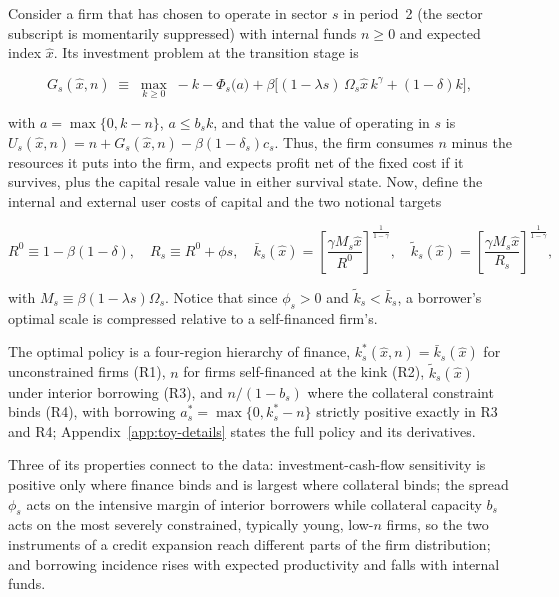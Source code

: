 \documentclass[12pt]{article}
\begin{document}
Consider a firm that has chosen to operate in sector $s$ in period~2 (the sector subscript is momentarily suppressed) with internal funds $n \geq0$ and expected index $\hat x$. Its investment problem at the transition stage is

\begin{equation}
  G_{s}(\hat x,n) \;\equiv\; \max_{k\geq0}\;
  -k - \Phi_{s}\!\big(a\big) + \beta\Big[(1-\lambda{s})\,\Omega_{s}\hat x\,
      k^{\gamma} + (1-\delta)k\Big],
  \label{eq:toy-Gdef}
\end{equation}

with $a=\max\{0,k-n\}$, $a\leq b_{s}k$, and that the value of operating in $s$ is $U_{s}(\hat x,n)=n+G_{s}(\hat x,n) -\beta(1-\delta_{s})c_{s}$. Thus, the firm consumes $n$ minus the resources it puts into the firm, and expects profit net of the fixed cost if it survives, plus the capital resale value in either survival state. Now, define the internal and external user costs of capital and the two notional targets
 
\begin{equation}
  R^0 \equiv 1-\beta(1-\delta),\quad
  R_{s} \equiv R^0+\phi{s},\quad
  \bar{k}_{s}(\hat x)
    = \left[\frac{\gamma M_{s}\hat x}{R^0}\right]^{\frac{1}{1-\gamma}},
  \quad
  \tilde{k}_{s}(\hat x)
    = \left[\frac{\gamma M_{s}\hat x}{R_{s}}\right]^{\frac{1}{1-\gamma}},
  \label{eq:toy-targets}
\end{equation}

with $M_{s}\equiv\beta(1-\lambda{s})\Omega_{s}$. Notice that since $\phi_{s}>0$ and $\tilde{k}_{s}<\bar{k}_{s}$, a borrower's optimal scale is compressed relative to a self-financed firm's.

The optimal policy is a four-region hierarchy of finance, $k_s^*(\hat{x}, n) = \bar{k}_s(\hat{x})$ for unconstrained firms (R1), $n$ for firms self-financed at the kink (R2), $\tilde{k}_s(\hat{x})$ under interior borrowing (R3), and $n/(1-b_s)$ where the collateral constraint binds (R4), with borrowing $a_s^* = \max\{0, k_s^* - n\}$ strictly positive exactly in R3 and R4; Appendix~\ref{app:toy-details} states the full policy and its derivatives. 

Three of its properties connect to the data: investment-cash-flow sensitivity is positive only where finance binds and is largest where collateral binds; the spread $\phi_s$ acts on the intensive margin of interior borrowers while collateral capacity $b_s$ acts on the most severely constrained, typically young, low-$n$ firms, so the two instruments of a credit expansion reach different parts of the firm distribution; and borrowing incidence rises with expected productivity and falls with internal funds. 
\end{document}
